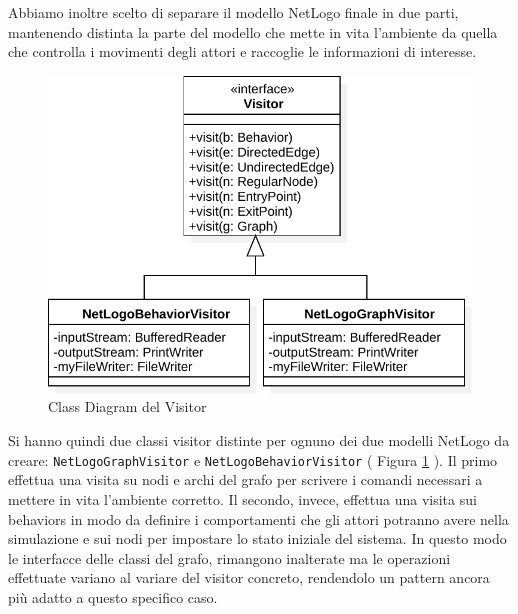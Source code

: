 Abbiamo inoltre scelto di separare il modello NetLogo finale in due parti, mantenendo distinta la parte del modello che mette in vita l'ambiente da quella che controlla i movimenti degli attori e raccoglie le informazioni di interesse.

\begin{figure}[htb]
\centering
\includegraphics[width=\textwidth,height=\textheight,keepaspectratio]{images/visitor-class-diagram.pdf}
\caption{Class Diagram del Visitor}
\label{fig:visitor-diagram}
\end{figure}
Si hanno quindi due classi visitor distinte per ognuno dei due modelli NetLogo da creare: \texttt{NetLogoGraphVisitor} e \texttt{NetLogoBehaviorVisitor} ( Figura \ref{fig:visitor-diagram} ). Il primo effettua una visita su nodi e archi del grafo per scrivere i comandi necessari a mettere in vita l'ambiente corretto. Il secondo, invece, effettua una visita sui behaviors in modo da definire i comportamenti che gli attori potranno avere nella simulazione e sui nodi per impostare lo stato iniziale del sistema. In questo modo le interfacce delle classi del grafo, rimangono inalterate ma le operazioni effettuate variano al variare del visitor concreto, rendendolo un pattern ancora più adatto a questo specifico caso.

